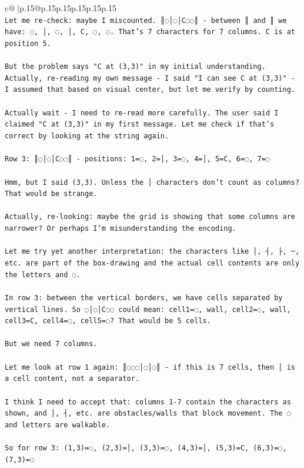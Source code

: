 \documentclass{article}
\begin{document}
{\begin{supertabular}{c@{$\;$}|p{.15\linewidth}@{}p{.15\linewidth}p{.15\linewidth}p{.15\linewidth}p{.15\linewidth}p{.15\linewidth}}
{{{\\ 
\texttt{Let me re{-}check: maybe I miscounted. ║◌│◌│C◌◌║ {-} between ║ and ║ we have: ◌, │, ◌, │, C, ◌, ◌. That's 7 characters for 7 columns. C is at position 5.} \\
\\ 
\texttt{But the problem says "C at (3,3)" in my initial understanding. Actually, re{-}reading my own message {-} I said "I can see C at (3,3)" {-} I assumed that based on visual center, but let me verify by counting.} \\
\\ 
\texttt{Actually wait {-} I need to re{-}read more carefully. The user said I claimed "C at (3,3)" in my first message. Let me check if that's correct by looking at the string again.} \\
\\ 
\texttt{Row 3: ║◌│◌│C◌◌║ {-} positions: 1=◌, 2=│, 3=◌, 4=│, 5=C, 6=◌, 7=◌} \\
\\ 
\texttt{Hmm, but I said (3,3). Unless the │ characters don't count as columns? That would be strange.} \\
\\ 
\texttt{Actually, re{-}looking: maybe the grid is showing that some columns are narrower? Or perhaps I'm misunderstanding the encoding.} \\
\\ 
\texttt{Let me try yet another interpretation: the characters like │, ┤, ├, ─, etc. are part of the box{-}drawing and the actual cell contents are only the letters and ◌.} \\
\\ 
\texttt{In row 3: between the vertical borders, we have cells separated by vertical lines. So ◌│◌│C◌◌ could mean: cell1=◌, wall, cell2=◌, wall, cell3=C, cell4=◌, cell5=◌? That would be 5 cells.} \\
\\ 
\texttt{But we need 7 columns. } \\
\\ 
\texttt{Let me look at row 1 again: ║◌◌◌│◌│◌║ {-} if this is 7 cells, then │ is a cell content, not a separator.} \\
\\ 
\texttt{I think I need to accept that: columns 1{-}7 contain the characters as shown, and │, ┤, etc. are obstacles/walls that block movement. The ◌ and letters are walkable.} \\
\\ 
\texttt{So for row 3: (1,3)=◌, (2,3)=│, (3,3)=◌, (4,3)=│, (5,3)=C, (6,3)=◌, (7,3)=◌} \\
}}}
\end{supertabular}}
\end{document}
